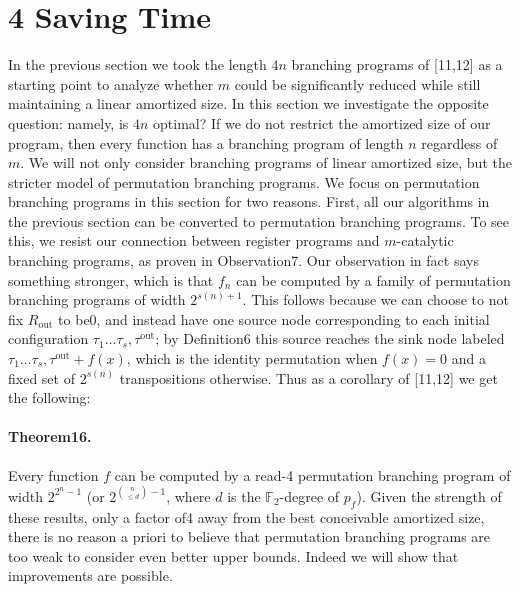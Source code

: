 \section*{4 Saving Time}
In the previous section we took the length $4n$ branching programs of [11,12] as a starting point to analyze whether $m$ could be significantly reduced while still maintaining a linear amortized size. In this section we investigate the opposite question: namely, is $4n$ optimal? If we do not restrict the amortized size of our program, then every function has a branching program of length $n$ regardless of $m$. We will not only consider branching programs of linear amortized size, but the stricter model of permutation branching programs.
We focus on permutation branching programs in this section for two reasons. First, all our algorithms in the previous section can be converted to permutation branching programs. To see this, we resist our connection between register programs and $m$-catalytic branching programs, as proven in Observation7. Our observation in fact says something stronger, which is that $f_n$ can be computed by a family of permutation branching programs of width $2^{s(n)+1}$. This follows because we can choose to not fix $R_{\mathrm{out}}$ to be0, and instead have one source node corresponding to each initial configuration $\tau_1\ldots\tau_s,\tau^{\mathrm{out}}$; by Definition6 this source reaches the sink node labeled $\tau_1\ldots\tau_s,\tau^{\mathrm{out}}+f(x)$, which is the identity permutation when $f(x)=0$ and a fixed set of $2^{s(n)}$ transpositions otherwise. Thus as a corollary of [11,12] we get the following:
\paragraph{Theorem16.} Every function $f$ can be computed by a read-4 permutation branching program of width $2^{2^n-1}$ (or $2^{\binom n{\leq d}-1}$, where $d$ is the $\mathbb F_2$-degree of $p_f$).
Given the strength of these results, only a factor of4 away from the best conceivable amortized size, there is no reason a priori to believe that permutation branching programs are too weak to consider even better upper bounds. Indeed we will show that improvements are possible.
